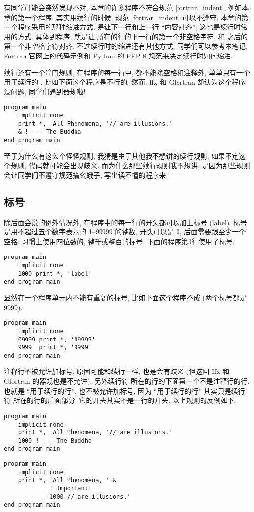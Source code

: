 有同学可能会突然发现不对, 本章的许多程序不符合规范 \ref{fortran_indent}, 例如本章的第一个程序. 其实用续行的时候, 规范 \ref{fortran_indent} 可以不遵守. 本章的第一个程序采用的那种缩进方式, 是让下一行和上一行 ``内容对齐'', 这也是续行时常用的方式. 具体到程序, 就是让 \ttt{*,} 所在的行的下一行的第一个非空格字符, 和 \ttt{*,} 之后的第一个非空格字符对齐. 不过续行时的缩进还有其他方式. 同学们可以参考本笔记,  Fortran \href{https://fortran-lang.org/}{官网}上的代码示例和 Python 的 \href{https://peps.python.org/pep-0008/}{PEP 8 规范}来决定续行时如何缩进.

续行还有一个冷门规则, 在程序的每一行中, 都不能除空格和注释外, 单单只有一个用于续行的 \ttt{\&{}}. 比如下面这个程序是不行的. 然而, Ifx 和 Gfortran 却认为这个程序没问题, 同学们遇到器规啦!
\begin{lstlisting}
program main
    implicit none
    print *, 'All Phenomena, '//'are illusions.'
    & ! --- The Buddha
end program main
\end{lstlisting}
至于为什么有这么个怪怪规则, 我猜是由于其他我不想讲的续行规则, 如果不定这个规则, 代码就可能会出现歧义. 而为什么那些续行规则我不想讲, 是因为那些规则会让同学们不遵守规范搞幺蛾子, 写出读不懂的程序来.

\subsection{标号}

除后面会说的例外情况外, 在程序中的每一行的开头都可以加上标号 (label). 标号是用不超过五个数字表示的 1--99999 的整数, 开头可以是 0, 后面需要跟至少一个空格. 习惯上使用四位数的, 整千或整百的标号. 下面的程序第3行使用了标号.
\begin{lstlisting}
program main
    implicit none
    1000 print *, 'label'
end program main
\end{lstlisting}

显然在一个程序单元内不能有重复的标号, 比如下面这个程序不成 (两个标号都是 9999).
\begin{lstlisting}
program main
    implicit none
    09999 print *, '09999'
    9999  print *, '9999'
end program main
\end{lstlisting}

注释行不被允许加标号, 原因可能和续行一样, 也是会有歧义 (但这回 Ifx 和 Gfortran 的器规也是不允许). 另外续行符 \ttt{\&{}} 所在的行的下面第一个不是注释行的行, 也就是 ``用于续行的行'', 也不被允许加标号, 因为 ``用于续行的行'' 其实只是续行符 \ttt{\&{}} 所在的行的后面部分, 它的开头其实不是一行的开头. 以上规则的反例如下.
\begin{lstlisting}
program main
    implicit none
    print *, 'All Phenomena, '//'are illusions.'
    1000 ! --- The Buddha
end program main
\end{lstlisting}
\begin{lstlisting}
program main
    implicit none
    print *, 'All Phenomena, ' &
             ! Important!
             1000 //'are illusions.'
end program main
\end{lstlisting}

